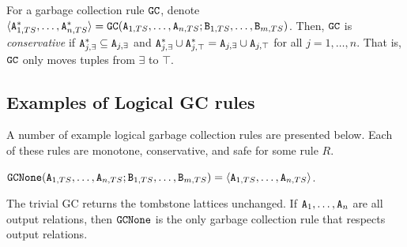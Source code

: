 \begin{property}
\label{property:gc_conservative}
For a garbage collection rule $\tt{GC}$, denote
$\langle \tt{A}_{1,TS}^*, \dots, \tt{A}_{n,TS}^* \rangle = \tt{GC}(\tt{A}_{1,TS}, \dots, \tt{A}_{n,TS}; \tt{B}_{1,TS}, \dots, \tt{B}_{m,TS})$.
Then, $\tt{GC}$ is \emph{conservative} if $\tt{A}_{j,\exists}^* \subseteq \tt{A}_{j,\exists}$ and $\tt{A}_{j,\exists}^* \cup \tt{A}_{j,\top}^* = \tt{A}_{j,\exists} \cup \tt{A}_{j,\top}$ for all $j=1,\dots,n$.
That is, $\tt{GC}$ only moves tuples from $\exists$ to $\top$.
\end{property}

\subsection{Examples of Logical GC rules}
\label{sec:logical:example}
A number of example logical garbage collection rules are presented below.
Each of these rules are monotone, conservative, and safe for some rule $R$.
\begin{example}[Trivial GC]
$\tt{GCNone}(\tt{A}_{1,TS}, \dots, \tt{A}_{n,TS}; \tt{B}_{1,TS}, \dots, \tt{B}_{m,TS}) = \langle \tt{A}_{1,TS}, \dots, \tt{A}_{n,TS} \rangle$.
\end{example}
The trivial GC returns the tombstone lattices unchanged.
If $\tt{A}_1, \dots, \tt{A}_n$ are all output relations, then $\tt{GCNone}$ is the only garbage collection rule that respects output relations.

